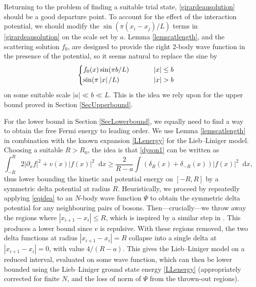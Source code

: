\documentclass[a4paper,11pt]{article}
\newcommand{\abs}[1]{\left\lvert #1 \right\rvert}
\newcommand*\diff{\mathop{}\!\mathrm{d}}
\numberwithin{equation}{section}
\begin{document}
	Returning to the problem of finding a suitable trial state, \eqref{girardeausolution} should be a good departure point. To account for the effect of the interaction potential, we should modify the $\sin(\pi(x_i-x_j)/L)$ terms in \eqref{girardeausolution} on the scale set by $a$. Lemma \ref{lemscatlength}, and the scattering solution $f_0$, are designed to provide the right 2-body wave function in the presence of the potential, so it seems natural to replace the sine by
	\begin{equation}
		\label{trialidea}
		\begin{cases*}
			f_0(x)\sin(\pi b/L)& \phantom{when} $|x|\leq b$\\
			\sin(\pi\abs{x}/L)& \phantom{when} $|x|> b$
		\end{cases*}
	\end{equation}
	on some suitable scale $\abs{a}\ll b\ll L$. This is the idea we rely upon for the upper bound proved in Section \ref{SecUpperbound}. 
	
	For the lower bound in Section \ref{SecLowerbound}, we equally need to find a way to obtain the free Fermi energy to leading order. We use Lemma \ref{lemscatlength} in combination with the known expansion \eqref{LLenergy} for the Lieb--Liniger model. Choosing a suitable $R>R_0$, the idea is that \eqref{dyson1} can be written as 
	\begin{equation}
		\label{eqidea}
		\int^{R}_{-R}2|\partial_x f|^2+v(x)|f(x)|^2\diff x\geq \frac{2}{R-a}\int (\delta_{R}(x)+\delta_{-{R}}(x))|f(x)|^2\diff x,
	\end{equation}
	thus lower bounding the kinetic and potential energy on $[-R,R]$ by a symmetric delta potential at radius $R$. Heuristically, we proceed by repeatedly applying \eqref{eqidea} to an $N$-body wave function $\Psi$ to obtain the symmetric delta potential for any neighbouring pairs of bosons. Then---crucially---we throw away the regions where $|x_{i+1}-x_i|\leq R$, which is inspired by a similar step in \cite{lieb2004one}. This produces a lower bound since $v$ is repulsive. With these regions removed, the two delta functions at radius $|x_{i+1}-x_i|= R$ collapse into a single delta at $|x_{i+1}-x_i|= 0$, with value $4/(R-a)$. This gives the Lieb--Liniger model on a reduced interval, evaluated on some wave function, which can then be lower bounded using the Lieb--Liniger ground state energy  \eqref{LLenergy} (appropriately corrected for finite $N$, and the loss of norm of $\Psi$ from the thrown-out regions). 
	
\end{document}
